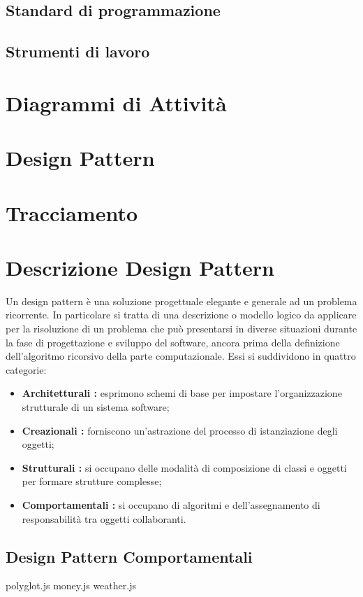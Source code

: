 \subsection{Standard di programmazione}

\subsection{Strumenti di lavoro}


\section{Diagrammi di Attività}


\section{Design Pattern}

\section{Tracciamento}




\appendix



\section{Descrizione Design Pattern}

Un design pattern è una soluzione progettuale elegante e generale ad un problema ricorrente. In particolare si tratta di una descrizione o modello logico da applicare per la risoluzione di un problema che può presentarsi in diverse situazioni durante la fase di progettazione e sviluppo del software, ancora prima della definizione dell'algoritmo ricorsivo della parte computazionale. Essi si suddividono in quattro categorie: \

\begin{itemize}
	\item \textbf{Architetturali :} esprimono schemi di base per impostare l'organizzazione strutturale di un sistema software;
	\item \textbf{Creazionali :} forniscono un'astrazione del processo di istanziazione degli oggetti;
	\item \textbf{Strutturali :} si occupano delle modalità di composizione di classi e oggetti per formare strutture complesse;
	\item \textbf{Comportamentali :} si occupano di algoritmi e dell'assegnamento di responsabilità tra oggetti collaboranti.

\end{itemize}

\subsection{Design Pattern Comportamentali}





polyglot.js
money.js
weather.js























